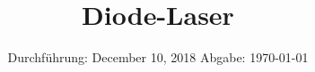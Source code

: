

\subject{V60}
\title{Diode-Laser}
\date{
  Durchführung: December 10, 2018
  \hspace{2em}
  Abgabe: \today
}



\maketitle
\thispagestyle{empty}
\tableofcontents
\newpage






\printbibliography


